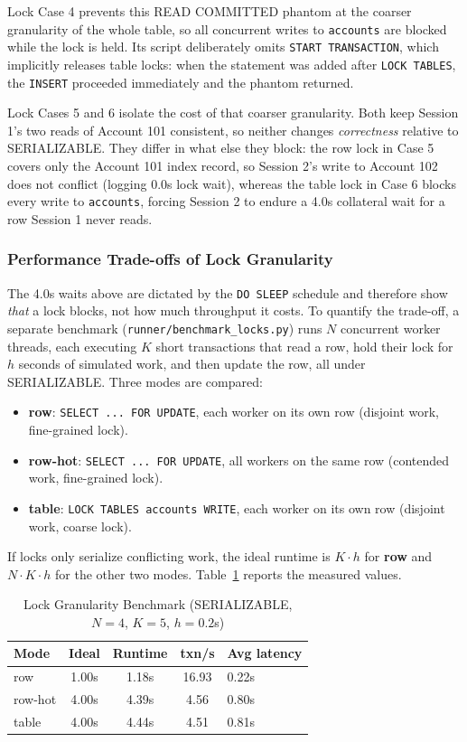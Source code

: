 \documentclass[sigconf, pbalance, nonacm]{acmart}
\begin{document}
Lock Case 4 prevents this READ COMMITTED phantom at the coarser granularity of the whole table, so all concurrent writes to \texttt{accounts} are blocked while the lock is held. Its script deliberately omits \texttt{START TRANSACTION}, which implicitly releases table locks: when the statement was added after \texttt{LOCK TABLES}, the \texttt{INSERT} proceeded immediately and the phantom returned.

Lock Cases 5 and 6 isolate the cost of that coarser granularity. Both keep Session 1's two reads of Account 101 consistent, so neither changes \emph{correctness} relative to SERIALIZABLE. They differ in what else they block: the row lock in Case 5 covers only the Account 101 index record, so Session 2's write to Account 102 does not conflict (logging 0.0s lock wait), whereas the table lock in Case 6 blocks every write to \texttt{accounts}, forcing Session 2 to endure a 4.0s collateral wait for a row Session 1 never reads.

\subsubsection{Performance Trade-offs of Lock Granularity}
The 4.0s waits above are dictated by the \texttt{DO SLEEP} schedule and therefore show \emph{that} a lock blocks, not how much throughput it costs. To quantify the trade-off, a separate benchmark (\texttt{runner/benchmark\_locks.py}) runs $N$ concurrent worker threads, each executing $K$ short transactions that read a row, hold their lock for $h$ seconds of simulated work, and then update the row, all under SERIALIZABLE. Three modes are compared:
\begin{itemize}
    \item \textbf{row}: \texttt{SELECT ... FOR UPDATE}, each worker on its own row (disjoint work, fine-grained lock).
    \item \textbf{row-hot}: \texttt{SELECT ... FOR UPDATE}, all workers on the same row (contended work, fine-grained lock).
    \item \textbf{table}: \texttt{LOCK TABLES accounts WRITE}, each worker on its own row (disjoint work, coarse lock).
\end{itemize}
If locks only serialize conflicting work, the ideal runtime is $K \cdot h$ for \textbf{row} and $N \cdot K \cdot h$ for the other two modes. Table~\ref{tab:lock_bench} reports the measured values.

\begin{table}[h]
\centering
\small
\caption{Lock Granularity Benchmark (SERIALIZABLE, $N=4$, $K=5$, $h=0.2$s)}
\label{tab:lock_bench}
\begin{tabularx}{\columnwidth}{l c c c X}
\toprule
\textbf{Mode} & \textbf{Ideal} & \textbf{Runtime} & \textbf{txn/s} & \textbf{Avg latency} \\
\midrule
row     & 1.00s & 1.18s & 16.93 & 0.22s \\
row-hot & 4.00s & 4.39s & 4.56  & 0.80s \\
table   & 4.00s & 4.44s & 4.51  & 0.81s \\
\bottomrule
\end{tabularx}
\end{table}
\end{document}
